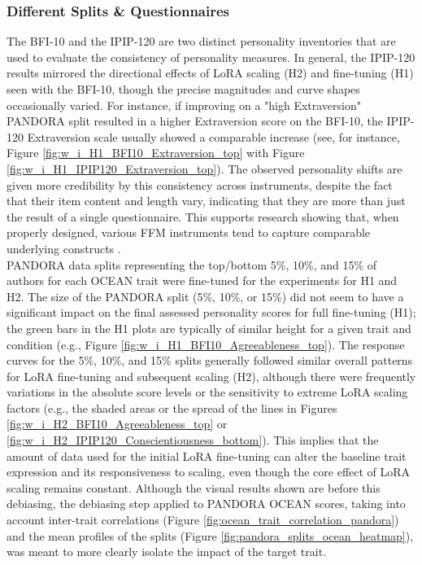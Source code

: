 \documentclass{DESSThesis}
\begin{document}
\subsubsection{Different Splits \& Questionnaires}
The BFI-10 and the IPIP-120 are two distinct personality inventories that are used to evaluate the consistency of personality measures. In general, the IPIP-120 results mirrored the directional effects of LoRA scaling (H2) and fine-tuning (H1) seen with the BFI-10, though the precise magnitudes and curve shapes occasionally varied. For instance, if improving on a "high Extraversion" PANDORA split resulted in a higher Extraversion score on the BFI-10, the IPIP-120 Extraversion scale usually showed a comparable increase (see, for instance, Figure \ref{fig:w_i_H1_BFI10_Extraversion_top} with Figure \ref{fig:w_i_H1_IPIP120_Extraversion_top}). The observed personality shifts are given more credibility by this consistency across instruments, despite the fact that their item content and length vary, indicating that they are more than just the result of a single questionnaire. This supports research showing that, when properly designed, various FFM instruments tend to capture comparable underlying constructs \cite{maples_test_2014, johnson_measuring_2014}.
\\
PANDORA data splits representing the top/bottom 5\%, 10\%, and 15\% of authors for each OCEAN trait were fine-tuned for the experiments for H1 and H2. The size of the PANDORA split (5\%, 10\%, or 15\%) did not seem to have a significant impact on the final assessed personality scores for full fine-tuning (H1); the green bars in the H1 plots are typically of similar height for a given trait and condition (e.g., Figure \ref{fig:w_i_H1_BFI10_Agreeableness_top}). The response curves for the 5\%, 10\%, and 15\% splits generally followed similar overall patterns for LoRA fine-tuning and subsequent scaling (H2), although there were frequently variations in the absolute score levels or the sensitivity to extreme LoRA scaling factors (e.g., the shaded areas or the spread of the lines in Figures \ref{fig:w_i_H2_BFI10_Agreeableness_top} or \ref{fig:w_i_H2_IPIP120_Conscientiousness_bottom}). This implies that the amount of data used for the initial LoRA fine-tuning can alter the baseline trait expression and its responsiveness to scaling, even though the core effect of LoRA scaling remains constant. Although the visual results shown are before this debiasing, the debiasing step applied to PANDORA OCEAN scores, taking into account inter-trait correlations (Figure \ref{fig:ocean_trait_correlation_pandora}) and the mean profiles of the splits (Figure \ref{fig:pandora_splits_ocean_heatmap}), was meant to more clearly isolate the impact of the target trait.
\end{document}
